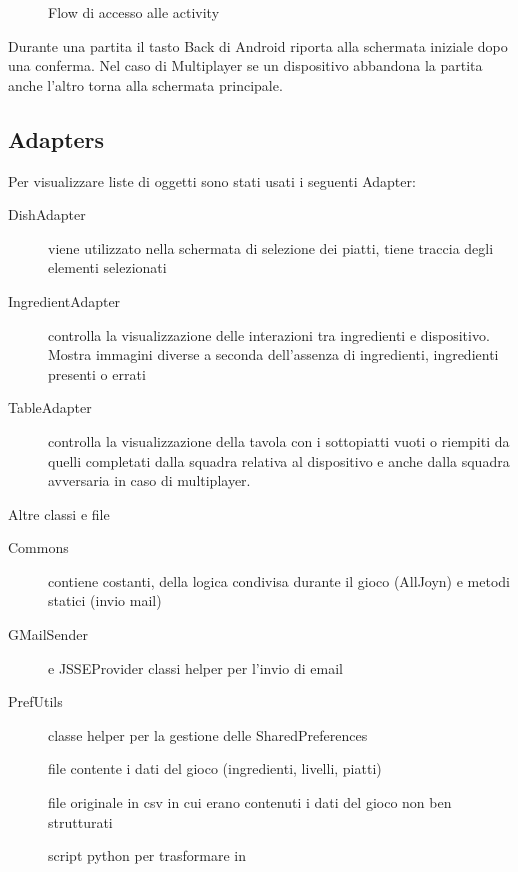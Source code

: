 \begin{figure}[h!]
\label{fig:flow}
\centering
{}
\caption{Flow di accesso alle activity}
\end{figure}


Durante una partita il tasto Back di Android riporta alla schermata iniziale dopo una conferma. Nel caso di Multiplayer se un dispositivo abbandona la partita anche l’altro torna alla schermata principale.


\subsection{Adapters}

Per visualizzare liste di oggetti sono stati usati i seguenti Adapter:
\begin{description}
\item[DishAdapter] viene utilizzato nella schermata di selezione dei piatti, tiene traccia degli elementi selezionati

\item[IngredientAdapter] controlla la visualizzazione delle interazioni tra ingredienti e dispositivo. Mostra immagini diverse a seconda dell’assenza di ingredienti, ingredienti presenti o errati

\item[TableAdapter] controlla la visualizzazione della tavola con i sottopiatti vuoti o riempiti da quelli completati dalla squadra relativa al dispositivo e anche dalla squadra avversaria in caso di multiplayer.
\end{description}

Altre classi e file
\begin{description}
\item[Commons] contiene costanti, della logica condivisa durante il gioco (AllJoyn) e metodi statici (invio mail)

\item[GMailSender] e JSSEProvider classi helper per l’invio di email

\item[PrefUtils] classe helper per la gestione delle SharedPreferences

\item[] file contente i dati del gioco (ingredienti, livelli, piatti)

\item[] file originale in csv in cui erano contenuti i dati del gioco non ben strutturati

\item[] script python per trasformare  in 
\end{description}
